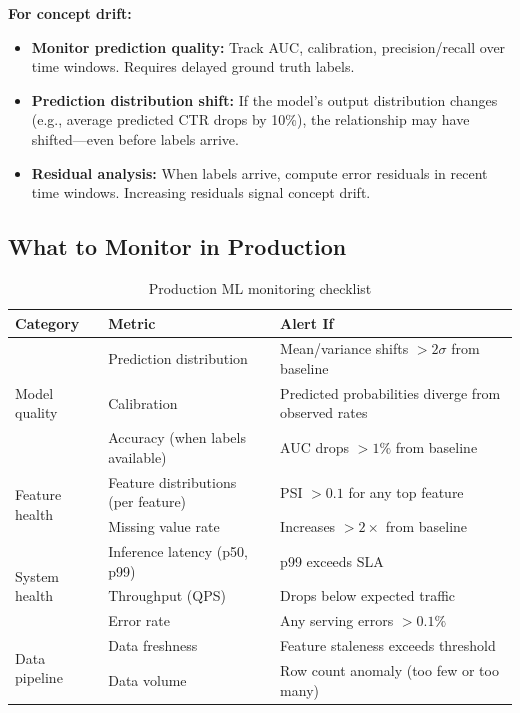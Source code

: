 \textbf{For concept drift:}
\begin{itemize}
    \item \textbf{Monitor prediction quality:} Track AUC, calibration, precision/recall over time windows. Requires delayed ground truth labels.
    \item \textbf{Prediction distribution shift:} If the model's output distribution changes (e.g., average predicted CTR drops by 10\%), the relationship may have shifted---even before labels arrive.
    \item \textbf{Residual analysis:} When labels arrive, compute error residuals in recent time windows. Increasing residuals signal concept drift.
\end{itemize}

\subsection{What to Monitor in Production}

\begin{table}[H]
\centering
\caption{Production ML monitoring checklist}
\begin{tabularx}{\textwidth}{llX}
\toprule
\textbf{Category} & \textbf{Metric} & \textbf{Alert If} \\
\midrule
\multirow{3}{*}{Model quality} & Prediction distribution & Mean/variance shifts $> 2\sigma$ from baseline \\
 & Calibration & Predicted probabilities diverge from observed rates \\
 & Accuracy (when labels available) & AUC drops $> 1\%$ from baseline \\
\midrule
\multirow{2}{*}{Feature health} & Feature distributions (per feature) & PSI $> 0.1$ for any top feature \\
 & Missing value rate & Increases $> 2\times$ from baseline \\
\midrule
\multirow{3}{*}{System health} & Inference latency (p50, p99) & p99 exceeds SLA \\
 & Throughput (QPS) & Drops below expected traffic \\
 & Error rate & Any serving errors $> 0.1\%$ \\
\midrule
\multirow{2}{*}{Data pipeline} & Data freshness & Feature staleness exceeds threshold \\
 & Data volume & Row count anomaly (too few or too many) \\
\bottomrule
\end{tabularx}
\end{table}

